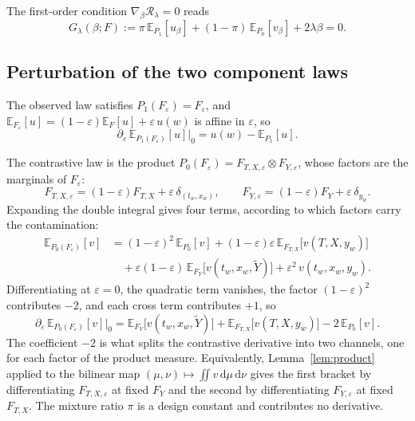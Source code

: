 \documentclass[11pt]{article}
\theoremstyle{plain}
\theoremstyle{definition}
\theoremstyle{remark}
\newcommand{\pE}{\ensuremath{\mathbb{E}}}
\newcommand{\cR}{\ensuremath{\mathcal{R}}}
\newcommand{\ratio}{\ensuremath{\pi}}
\newcommand{\dd}{\,\mathrm{d}}
\begin{document}
The first-order condition $\nabla_\beta \cR_\lambda = 0$ reads
\begin{equation}
G_\lambda(\beta;F)
:= \ratio\,\pE_{P_1}[u_\beta] + (1-\ratio)\,\pE_{P_0}[v_\beta] + 2\lambda\beta = 0 .
\label{eq:app-foc}
\end{equation}

\subsection{Perturbation of the two component laws}
\label{app:logistic-channels}

The observed law satisfies $P_1(F_\varepsilon) = F_\varepsilon$, and
$\pE_{F_\varepsilon}[u] = (1-\varepsilon)\pE_F[u] + \varepsilon\,u(w)$ is affine in
$\varepsilon$, so
\begin{equation}
\partial_\varepsilon\, \pE_{P_1(F_\varepsilon)}[u]\big|_{0}
= u(w) - \pE_{P_1}[u].
\label{eq:app-channel1}
\end{equation}

The contrastive law is the product
$P_0(F_\varepsilon) = F_{T,X,\varepsilon} \otimes F_{Y,\varepsilon}$, whose factors are
the marginals of $F_\varepsilon$:
\[
F_{T,X,\varepsilon} = (1-\varepsilon)F_{T,X} + \varepsilon\,\delta_{(t_w,x_w)},
\qquad
F_{Y,\varepsilon} = (1-\varepsilon)F_Y + \varepsilon\,\delta_{y_w} .
\]
Expanding the double integral gives four terms, according to which factors carry the
contamination:
\begin{equation}
\begin{aligned}
\pE_{P_0(F_\varepsilon)}[v]
&= (1-\varepsilon)^2\,\pE_{P_0}[v]
+ (1-\varepsilon)\varepsilon\,\pE_{F_{T,X}}\big[ v(T,X,y_w) \big] \\
&\quad + \varepsilon(1-\varepsilon)\,\pE_{F_Y}\big[ v(t_w,x_w,\widetilde Y) \big]
+ \varepsilon^2\, v(t_w,x_w,y_w).
\end{aligned}
\label{eq:app-p0-expanded}
\end{equation}
Differentiating at $\varepsilon = 0$, the quadratic term vanishes, the factor
$(1-\varepsilon)^2$ contributes $-2$, and each cross term contributes $+1$, so
\begin{equation}
\partial_\varepsilon\, \pE_{P_0(F_\varepsilon)}[v]\big|_{0}
= \pE_{F_Y}\big[ v(t_w,x_w,\widetilde Y) \big]
+ \pE_{F_{T,X}}\big[ v(T,X,y_w) \big]
- 2\,\pE_{P_0}[v].
\label{eq:app-channel0}
\end{equation}
The coefficient $-2$ is what splits the contrastive derivative into two channels, one for
each factor of the product measure. Equivalently, Lemma~\ref{lem:product} applied to the
bilinear map $(\mu,\nu) \mapsto \iint v \dd\mu \dd\nu$ gives the first bracket by
differentiating $F_{T,X,\varepsilon}$ at fixed $F_Y$ and the second by differentiating
$F_{Y,\varepsilon}$ at fixed $F_{T,X}$. The mixture ratio $\ratio$ is a design constant
and contributes no derivative.
\end{document}
